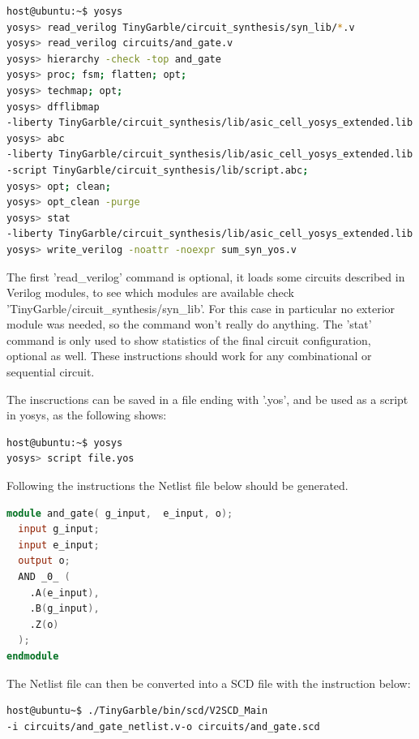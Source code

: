\begin{refsection}
\begin{lstlisting}[caption={Yosys instructions to compile the combinational circuit Verilog file into a Netlist File. 'Sudo yosys' may be needed.}, language=bash, captionpos=b]
host@ubuntu:~$ yosys
yosys> read_verilog TinyGarble/circuit_synthesis/syn_lib/*.v
yosys> read_verilog circuits/and_gate.v 
yosys> hierarchy -check -top and_gate
yosys> proc; fsm; flatten; opt;
yosys> techmap; opt; 
yosys> dfflibmap 
-liberty TinyGarble/circuit_synthesis/lib/asic_cell_yosys_extended.lib
yosys> abc 
-liberty TinyGarble/circuit_synthesis/lib/asic_cell_yosys_extended.lib 
-script TinyGarble/circuit_synthesis/lib/script.abc; 
yosys> opt; clean; 
yosys> opt_clean -purge
yosys> stat
-liberty TinyGarble/circuit_synthesis/lib/asic_cell_yosys_extended.lib
yosys> write_verilog -noattr -noexpr sum_syn_yos.v				
\end{lstlisting}

The first 'read\_verilog' command is optional, it loads some circuits described in Verilog modules, to see which modules are available check 'TinyGarble/circuit\_synthesis/syn\_lib'. For this case in particular no exterior module was needed, so the command won't really do anything.
The 'stat' command is only used to show statistics of the final circuit configuration, optional as well.
These instructions should work for any combinational or sequential circuit.

The inscructions can be saved in a file ending with '.yos', and be used as a script in yosys, as the following shows:
\begin{lstlisting}[caption={Running yosys instructions contained in a script file.}, language=bash, captionpos=b]
host@ubuntu:~$ yosys
yosys> script file.yos
\end{lstlisting}

\newpage

Following the instructions the Netlist file below should be generated.

\begin{lstlisting}[caption={and\_gate\_netlist.v}, language=Verilog, captionpos=b]
module and_gate( g_input,  e_input, o);
  input g_input;
  input e_input;
  output o;
  AND _0_ (
    .A(e_input),
    .B(g_input),
    .Z(o)
  );
endmodule
\end{lstlisting}

The Netlist file can then be converted into a SCD file with the instruction below:

\begin{lstlisting}[caption={Installation of Yosys-abc}, language=bash, captionpos=b]
host@ubuntu~$ ./TinyGarble/bin/scd/V2SCD_Main 
-i circuits/and_gate_netlist.v-o circuits/and_gate.scd		
\end{lstlisting}


\end{refsection}
